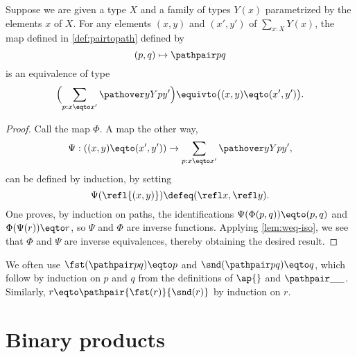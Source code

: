 \begin{lemma}\label{lem:isEq-pair=}
  Suppose we are given a type $X$ and a family of types $Y(x)$ parametrized by the elements $x$ of $X$.
  For any elements $(x,y)$ and $(x',y')$ of $\sum _{x:X} Y(x)$,
  the map defined in \cref{def:pairtopath} defined by
  \[
    (p,q) \mapsto \pathpair p q
  \]
  is an equivalence of type
  \[
    \Bigl( \sum_{p:x \eqto x'} \pathover y Y p {y'} \Bigr)
    \equivto \bigl( (x,y) \eqto (x',y') \bigr).
  \]
\end{lemma}

\begin{proof}
  Call the map $\Phi$.
  A map the other way,
  \[
    \Psi : ((x,y) \eqto (x',y')) \to \sum_{p:x \eqto x'} \pathover y Y p {y'},
  \]
  can be defined by induction, by setting
  \[
    \Psi (\refl {(x,y)}) \defeq (\refl x, \refl y).
  \]
  One proves, by induction on paths, the identifications $ \Psi ( \Phi (p,q) ) \eqto (p,q) $ and $ \Phi (\Psi ( r )) \eqto r$, so $\Psi$ and $\Phi$ are inverse functions.
  Applying \cref{lem:weq-iso}, we see that $\Phi$ and $\Psi$ are inverse equivalences, thereby obtaining the desired result.
\end{proof}

We often use $\fst(\pathpair p q) \eqto p$ and $\snd(\pathpair p q) \eqto q$,
which follow by induction on $p$ and $q$ from the definitions of $\ap{}$ and $\pathpair \_ \_$.
Similarly, $r \eqto \pathpair {\fst(r)}{\snd(r)}$ by induction on $r$.

\section{Binary products}
\label{sec:binprod-types}

